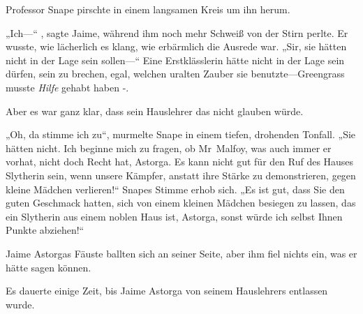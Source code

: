 Professor Snape pirschte in einem langsamen Kreis um ihn herum.

„Ich—“ , sagte Jaime, während ihm noch mehr Schweiß von der Stirn perlte. Er wusste, wie lächerlich es klang, wie erbärmlich die Ausrede war. „Sir, sie hätten nicht in der Lage sein sollen—“ Eine Erstklässlerin hätte nicht in der Lage sein dürfen, sein  zu brechen, egal, welchen uralten Zauber sie benutzte—Greengrass musste \emph{Hilfe} gehabt haben -.

Aber es war ganz klar, dass sein Hauslehrer das nicht glauben würde.

„Oh, da stimme ich zu“, murmelte Snape in einem tiefen, drohenden Tonfall. „Sie hätten nicht. Ich beginne mich zu fragen, ob Mr~Malfoy, was auch immer er vorhat, nicht doch Recht hat, Astorga. Es kann nicht gut für den Ruf des Hauses Slytherin sein, wenn unsere Kämpfer, anstatt ihre Stärke zu demonstrieren, gegen kleine Mädchen verlieren!“ Snapes Stimme erhob sich. „Es ist gut, dass Sie den guten Geschmack hatten, sich von einem kleinen Mädchen besiegen zu lassen, das ein Slytherin aus einem noblen Haus ist, Astorga, sonst würde ich selbst Ihnen Punkte abziehen!“

Jaime Astorgas Fäuste ballten sich an seiner Seite, aber ihm fiel nichts ein, was er hätte sagen können.

Es dauerte einige Zeit, bis Jaime Astorga von seinem Hauslehrers entlassen wurde.


